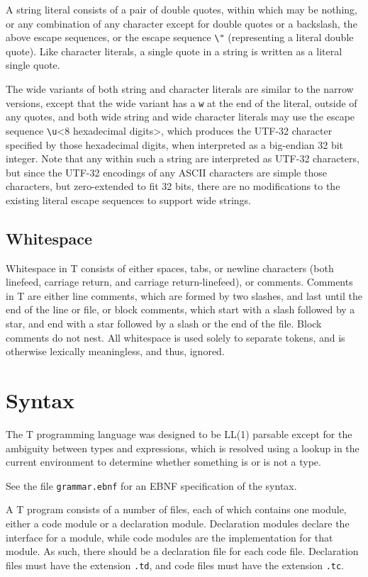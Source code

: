 \documentclass[letterpaper,12pt]{book}
\begin{document}
A string literal consists of a pair of double quotes, within which may be nothing, or any combination of any character except for double quotes or a backslash, the above escape sequences, or the escape sequence \verb|\"| (representing a literal double quote). Like character literals, a single quote in a string is written as a literal single quote.

The wide variants of both string and character literals are similar to the narrow versions, except that the wide variant has a \texttt{w} at the end of the literal, outside of any quotes, and both wide string and wide character literals may use the escape sequence \verb|\u|{\textless}8 hexadecimal digits{\textgreater}, which produces the UTF-32 character specified by those hexadecimal digits, when interpreted as a big-endian 32 bit integer. Note that any within such a string are interpreted as UTF-32 characters, but since the UTF-32 encodings of any ASCII characters are simple those characters, but zero-extended to fit 32 bits, there are no modifications to the existing literal escape sequences to support wide strings.

\section{Whitespace}

Whitespace in T consists of either spaces, tabs, or newline characters (both linefeed, carriage return, and carriage return-linefeed), or comments. Comments in T are either line comments, which are formed by two slashes, and last until the end of the line or file, or block comments, which start with a slash followed by a star, and end with a star followed by a slash or the end of the file. Block comments do not nest. All whitespace is used solely to separate tokens, and is otherwise lexically meaningless, and thus, ignored.

\chapter{Syntax}

The T programming language was designed to be LL(1) parsable except for the ambiguity between types and expressions, which is resolved using a lookup in the current environment to determine whether something is or is not a type.

See the file \texttt{grammar.ebnf} for an EBNF specification of the syntax.

A T program consists of a number of files, each of which contains one module, either a code module or a declaration module. Declaration modules declare the interface for a module, while code modules are the implementation for that module. As such, there should be a declaration file for each code file. Declaration files must have the extension \texttt{.td}, and code files must have the extension \texttt{.tc}.
\end{document}
